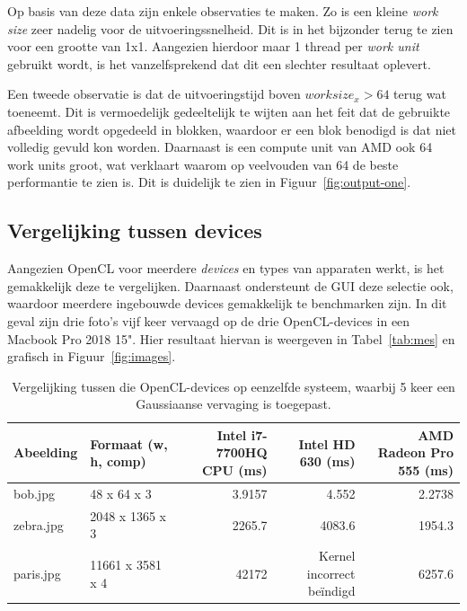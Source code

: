 \documentclass[twocolumn, a4paper]{article}
\begin{document}
Op basis van deze data zijn enkele observaties te maken. Zo is een kleine \emph{work size} zeer nadelig voor de uitvoeringssnelheid. Dit is in het bijzonder terug te zien voor een grootte van 1x1. Aangezien hierdoor maar 1 thread per \emph{work unit} gebruikt wordt, is het vanzelfsprekend dat dit een slechter resultaat oplevert.

Een tweede observatie is dat de uitvoeringstijd boven $work size_x > 64$ terug wat toeneemt. Dit is vermoedelijk gedeeltelijk te wijten aan het feit dat de gebruikte afbeelding wordt opgedeeld in blokken, waardoor er een blok benodigd is dat niet volledig gevuld kon worden. Daarnaast is een compute unit van AMD ook 64 work units groot, wat verklaart waarom op veelvouden van 64 de beste performantie te zien is. Dit is duidelijk te zien in Figuur~\ref{fig:output-one}.

\subsection{Vergelijking tussen devices}
Aangezien OpenCL voor meerdere \emph{devices} en types van apparaten werkt, is het gemakkelijk deze te vergelijken. Daarnaast ondersteunt de GUI deze selectie ook, waardoor meerdere ingebouwde devices gemakkelijk te benchmarken zijn. In dit geval zijn drie foto's vijf keer vervaagd op de drie OpenCL-devices in een Macbook Pro 2018 15". Hier resultaat hiervan is weergeven in Tabel~\ref{tab:mes} en grafisch in Figuur~\ref{fig:images}.


\begin{table}[]
    \centering
    \caption{Vergelijking tussen die OpenCL-devices op eenzelfde systeem, waarbij 5 keer een Gaussiaanse vervaging is toegepast.}\label{tab:mes}
    \label{table:measurements}
    \begin{tabular}{@{}llrrr@{}}
        \toprule
        Abeelding & Formaat (w, h, comp) & Intel i7-7700HQ CPU {(}ms{)} & Intel HD 630 {(}ms{)} & AMD Radeon Pro 555 {(}ms{)} \\ \midrule
        bob.jpg   & 48 x 64 x 3              & 3.9157                       & 4.552                 & 2.2738                      \\
        zebra.jpg & 2048 x 1365 x 3      & 2265.7                       & 4083.6                & 1954.3                      \\
        paris.jpg & 11661 x 3581 x 4 & 42172 &Kernel incorrect beïndigd& 6257.6 \\ \bottomrule
    \end{tabular}
\end{table}
\end{document}
